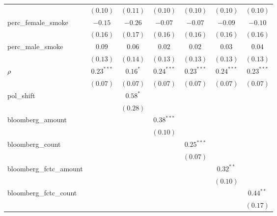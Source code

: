 \begin{table}[!h]
\begin{center}
\begin{tabular}{l c c c c c c }
                        & $(0.10)$     & $(0.11)$     & $(0.10)$     & $(0.10)$     & $(0.10)$     & $(0.10)$     \\
perc\_female\_smoke     & $-0.15$      & $-0.26$      & $-0.07$      & $-0.07$      & $-0.09$      & $-0.10$      \\
                        & $(0.16)$     & $(0.17)$     & $(0.16)$     & $(0.16)$     & $(0.16)$     & $(0.16)$     \\
perc\_male\_smoke       & $0.09$       & $0.06$       & $0.02$       & $0.02$       & $0.03$       & $0.04$       \\
                        & $(0.13)$     & $(0.14)$     & $(0.13)$     & $(0.13)$     & $(0.13)$     & $(0.13)$     \\
$\rho$                  & $0.23^{***}$ & $0.16^{*}$   & $0.24^{***}$ & $0.23^{***}$ & $0.24^{***}$ & $0.23^{***}$ \\
                        & $(0.07)$     & $(0.07)$     & $(0.07)$     & $(0.07)$     & $(0.07)$     & $(0.07)$     \\
pol\_shift              &              & $0.58^{*}$   &              &              &              &              \\
                        &              & $(0.28)$     &              &              &              &              \\
bloomberg\_amount       &              &              & $0.38^{***}$ &              &              &              \\
                        &              &              & $(0.10)$     &              &              &              \\
bloomberg\_count        &              &              &              & $0.25^{***}$ &              &              \\
                        &              &              &              & $(0.07)$     &              &              \\
bloomberg\_fctc\_amount &              &              &              &              & $0.32^{**}$  &              \\
                        &              &              &              &              & $(0.10)$     &              \\
bloomberg\_fctc\_count  &              &              &              &              &              & $0.44^{**}$  \\
                        &              &              &              &              &              & $(0.17)$     \\

\end{tabular}
\end{center}
\end{table}
